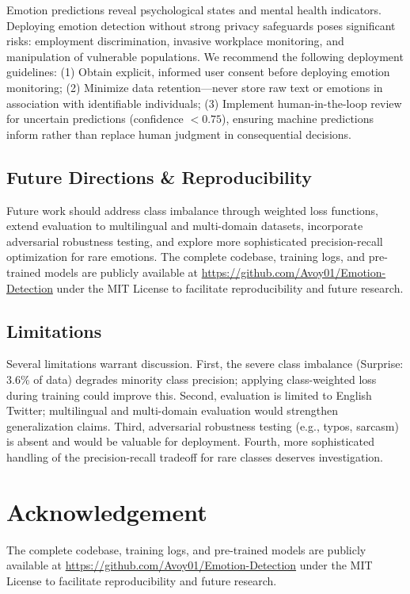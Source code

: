 \documentclass[conference]{IEEEtran}
\begin{document}
Emotion predictions reveal psychological states and mental health indicators. Deploying emotion detection without strong privacy safeguards poses significant risks: employment discrimination, invasive workplace monitoring, and manipulation of vulnerable populations. We recommend the following deployment guidelines: (1) Obtain explicit, informed user consent before deploying emotion monitoring; (2) Minimize data retention—never store raw text or emotions in association with identifiable individuals; (3) Implement human-in-the-loop review for uncertain predictions (confidence $< 0.75$), ensuring machine predictions inform rather than replace human judgment in consequential decisions.

\subsection{Future Directions \& Reproducibility}

Future work should address class imbalance through weighted loss functions, extend evaluation to multilingual and multi-domain datasets, incorporate adversarial robustness testing, and explore more sophisticated precision-recall optimization for rare emotions. The complete codebase, training logs, and pre-trained models are publicly available at \url{https://github.com/Avoy01/Emotion-Detection} under the MIT License to facilitate reproducibility and future research.

\subsection{Limitations}

Several limitations warrant discussion. First, the severe class imbalance (Surprise: 3.6\% of data) degrades minority class precision; applying class-weighted loss during training could improve this. Second, evaluation is limited to English Twitter; multilingual and multi-domain evaluation would strengthen generalization claims. Third, adversarial robustness testing (e.g., typos, sarcasm) is absent and would be valuable for deployment. Fourth, more sophisticated handling of the precision-recall tradeoff for rare classes deserves investigation.

\section*{Acknowledgement}
The complete codebase, training logs, and pre-trained models are publicly 
available at \url{https://github.com/Avoy01/Emotion-Detection} under the 
MIT License to facilitate reproducibility and future research.
\end{document}
